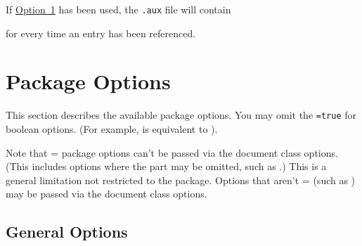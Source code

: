 \documentclass[report,inlinetitle]{nlctdoc}
\newcommand*{\opt}[1]{\hyperlink{option#1}{Option~#1}}
\begin{document}
If \opt1 has been used, the \texttt{.aux} file will contain
\begin{definition}
\end{definition}
for every time an entry has been referenced.

\chapter{Package Options}
\label{sec:pkgopts}

This section describes the available  package
options. You may omit the \texttt{=true} for boolean options. (For
example,  is equivalent to ).

\begin{important}
Note that = package options can't be passed via the
document class options. (This includes options where the
 part may be omitted, such as .) This is
a general limitation not restricted to the 
package. Options that aren't = (such as
) may be passed via the document class options.
\end{important}

\section{General Options}
\label{sec:pkgopts-general}
\end{document}
